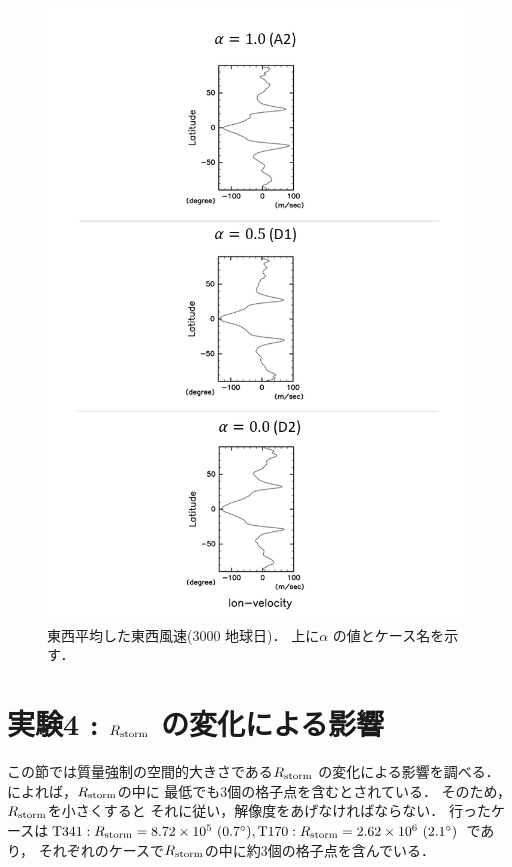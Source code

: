 \documentclass[a4j,12pt,openbib,oneside]{jreport}
\begin{document}
\begin{figure}[ht]
  \begin{center}
    \includegraphics[clip,width=14cm]{./fig/result/case3/case3_vellon.png}
    \caption{
      \footnotesize{東西平均した東西風速(3000 地球日)．
上に$\alpha$ の値とケース名を示す．
      }
    }
    \label{fig:case3_vellon}
  \end{center}
\end{figure}
%
%
\clearpage
\newpage
\section{実験4 : $R_{\rm{storm}}$ の変化による影響}
\label{sec:case4}
この節では質量強制の空間的大きさである$R_{\rm{storm}}$ の変化による影響を調べる．
\cite{Showman2007} によれば，$R_{\rm{storm}}$の中に
最低でも3個の格子点を含むとされている．
そのため，$R_{\rm{storm}}$を小さくすると
それに従い，解像度をあげなければならない．
行ったケースは${\rm{T341}} : R_{\rm{storm}} = 8.72 \times 10^5 ~(0.7^\circ), 
{\rm{T170}} : R_{\rm{storm}} = 2.62 \times 10^6 ~(2.1^\circ)$ であり，
それぞれのケースで$R_{\rm{storm}}$の中に約3個の格子点を含んでいる．
%
\end{document}
